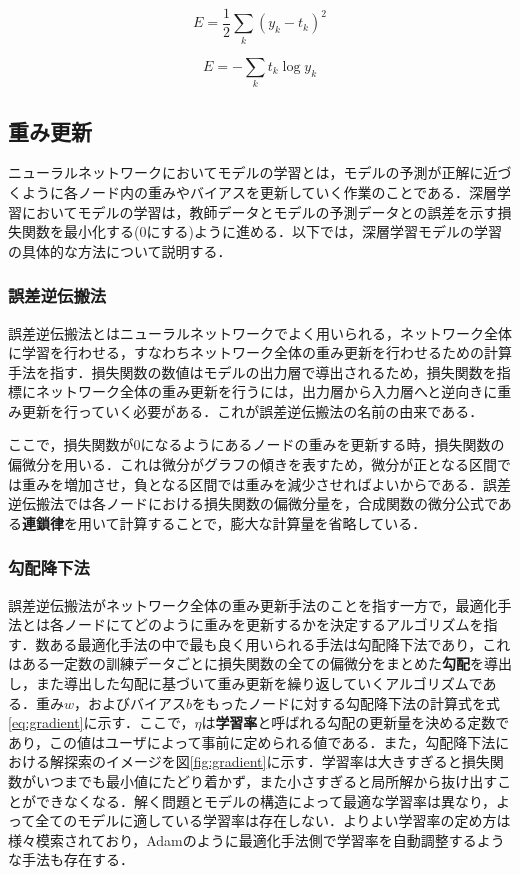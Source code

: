 \documentclass[a4j, 11pt]{jreport}
\begin{document}
\begin{equation}
	E = \frac{1}{2} \sum_{k} ({y_k} - t_k)^2
	\label{eq:mse}
\end{equation}

\begin{equation}
	E = -\sum_{k}t_{k}\log y_{k}
	\label{eq:cee}
\end{equation}

\subsection{重み更新}
ニューラルネットワークにおいてモデルの学習とは，モデルの予測が正解に近づくように各ノード内の重みやバイアスを更新していく作業のことである．深層学習においてモデルの学習は，教師データとモデルの予測データとの誤差を示す損失関数を最小化する(0にする)ように進める．以下では，深層学習モデルの学習の具体的な方法について説明する．
\subsubsection{誤差逆伝搬法}
誤差逆伝搬法とはニューラルネットワークでよく用いられる，ネットワーク全体に学習を行わせる，すなわちネットワーク全体の重み更新を行わせるための計算手法を指す．損失関数の数値はモデルの出力層で導出されるため，損失関数を指標にネットワーク全体の重み更新を行うには，出力層から入力層へと逆向きに重み更新を行っていく必要がある．これが誤差逆伝搬法の名前の由来である．

ここで，損失関数が0になるようにあるノードの重みを更新する時，損失関数の偏微分を用いる．これは微分がグラフの傾きを表すため，微分が正となる区間では重みを増加させ，負となる区間では重みを減少させればよいからである．誤差逆伝搬法では各ノードにおける損失関数の偏微分量を，合成関数の微分公式である\textbf{連鎖律}を用いて計算することで，膨大な計算量を省略している．
\subsubsection{勾配降下法}
誤差逆伝搬法がネットワーク全体の重み更新手法のことを指す一方で，最適化手法とは各ノードにてどのように重みを更新するかを決定するアルゴリズムを指す．数ある最適化手法の中で最も良く用いられる手法は勾配降下法であり，これはある一定数の訓練データごとに損失関数の全ての偏微分をまとめた\textbf{勾配}を導出し，また導出した勾配に基づいて重み更新を繰り返していくアルゴリズムである．重み$w$，およびバイアス$b$をもったノードに対する勾配降下法の計算式を式\ref{eq:gradient}に示す．ここで，$\eta$は\textbf{学習率}と呼ばれる勾配の更新量を決める定数であり，この値はユーザによって事前に定められる値である．また，勾配降下法における解探索のイメージを図\ref{fig:gradient}に示す．学習率は大きすぎると損失関数がいつまでも最小値にたどり着かず，また小さすぎると局所解から抜け出すことができなくなる．解く問題とモデルの構造によって最適な学習率は異なり，よって全てのモデルに適している学習率は存在しない．よりよい学習率の定め方は様々模索されており，Adam\cite{Kingma2015}のように最適化手法側で学習率を自動調整するような手法も存在する．
\end{document}
